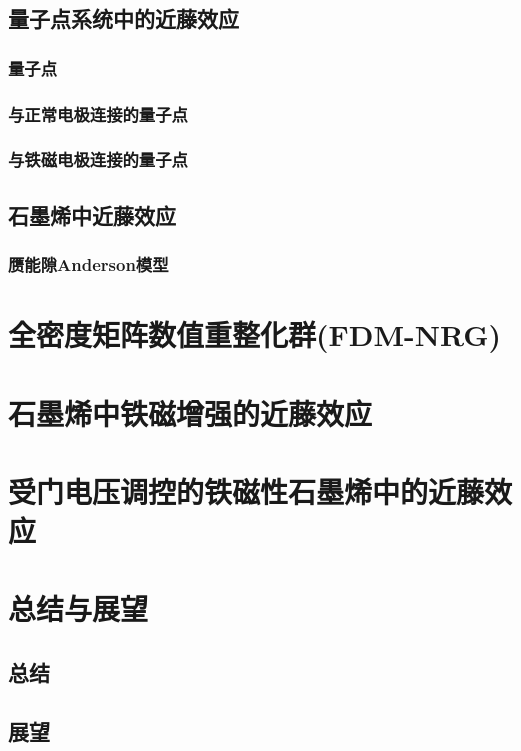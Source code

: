 \documentclass[twoside]{LZUthesis}
\begin{document}
\section{量子点系统中的近藤效应}
\subsection{量子点}
\subsection{与正常电极连接的量子点}
\subsection{与铁磁电极连接的量子点}
\section{石墨烯中近藤效应}
\subsection{赝能隙Anderson模型}

\chapter{全密度矩阵数值重整化群(FDM-NRG)}

\chapter{石墨烯中铁磁增强的近藤效应}


\chapter{受门电压调控的铁磁性石墨烯中的近藤效应}


\chapter{总结与展望}

\section{总结}
\section{展望}




%
%

\end{document}
